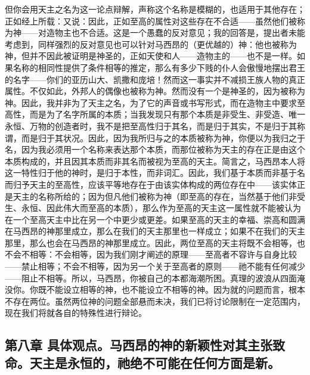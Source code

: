 但你会用天主之名为这一论点辩解，声称这个名称是模糊的，也适用于其他存在；正如经上所载：又说：因此，正如至高的属性对这些存在不合适——虽然他们被称为神——对造物主也不合适。这是一个愚蠢的反对意见；我的回答是，提出者未能考虑到，同样强烈的反对意见也可以针对马西昂的（更优越的）神：他也被称为神，但并不因此被证明是神圣的，正如天使和人——造物主的——也不是一样。如果名称的相同性提供了条件相等的推定，那么有多少下贱的仆人会傲慢地摆出君王的名字——你们的亚历山大、凯撒和庞培！然而这一事实并不减损王族人物的真正属性。不仅如此，外邦人的偶像也被称为神。然而没有一个是神圣的，因为被称为神。因此，我并非为了天主之名，为了它的声音或书写形式，而在造物主中要求至高性，而是为了名字所属的本质；当我发现只有那个本质是非受生、非受造、唯一永恒、万物的创造者时，我不是把至高性归于其名，而是归于其实，不是归于其称谓，而是归于其状况。因此，因为我所归与之的本质被称为神，你便以为我归之于名，因为我必须用一个名称来表达那个本质，而那位被称为天主的存在正是由这个本质构成的，并且因其本质而非其名而被视为至高的天主。简言之，马西昂本人将这一特性归于他的神时，是归于本性，而非词汇。因此，我们基于本质而非基于名而归予天主的至高性，应该平等地存在于由该实体构成的两位存在中——该实体正是天主的名称所给的；因为但凡他们被称为神（即至高的存在，当然基于他们非受生、永恒、因此伟大而至高的本质），那么作为至高的天主这一属性就不能被认为在一个至高天主中比在另一个中更少或更差。如果至高的天主的幸福、崇高和圆满在马西昂的神那里成立，那么在我们的天主那里也一样成立；如果不在我们的天主那里，那么也会在马西昂的神那里成立。因此，两位至高的天主将既不会相等，也不会不相等：不会相等，因为我们刚才阐述的原理——至高者不容许与自身比较——禁止相等；不会不相等，因为另一个关于至高者的原则——祂不能有任何减少——阻止不相等。所以，马西昂，你被自己的本都海潮所困。真理的波浪从四面淹没你。你既不能设立相等的神，也不能设立不相等的神。因为就的问题而言，根本不存在两位。虽然两位神的问题全部悬而未决，我们已将讨论限制在一定范围内，现在我们将就各自的特殊性进行辩论。\par


\subsection{第八章 具体观点。马西昂的神的新颖性对其主张致命。天主是永恒的，祂绝不可能在任何方面是新。}


